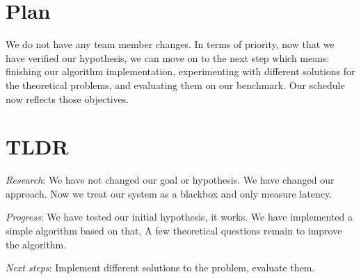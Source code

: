\documentclass[12pt]{article}
\begin{document}
\section{Plan}

We do not have any team member changes. In terms of priority, now that we have verified our hypothesis, we can move on to the next step which means: finishing our algorithm implementation, experimenting with different solutions for the theoretical problems, and evaluating them on our benchmark. Our schedule now reflects those objectives.

\section{TLDR}

\textit{Research}: We have not changed our goal or hypothesis. We have changed our approach. Now we treat our system as a blackbox and only measure latency.

\singlespacing
\noindent \textit{Progress}: We have tested our initial hypothesis, it works. We have implemented a simple algorithm based on that. A few theoretical questions remain to improve the algorithm.

\singlespacing
\noindent \textit{Next steps}: Implement different solutions to the problem, evaluate them.


%
%
\end{document}
